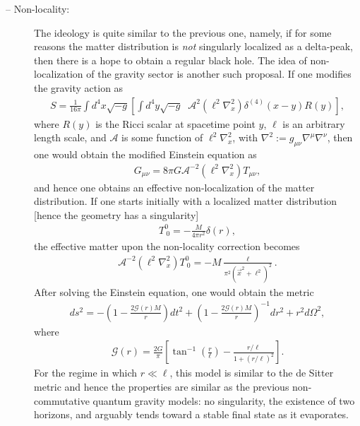 \documentclass[12pt]{article}
\newcommand{\2}{$^2$}
\newcommand{\3}{$^3$}
\newcommand{\4}{$_4$}
\newcommand{\5}{$_5$}
\begin{document}
\begin{description}
\item[-- Non-locality:] The ideology is quite similar to the previous one, namely, if for some reasons the matter distribution is \emph{not} singularly localized as a delta-peak, then there is a hope to obtain a regular black hole. The idea of non-localization of the gravity sector \cite{1202.2102} is another such proposal. If one modifies the gravity action as
\begin{eqnarray}
S = \frac{1}{16\pi} \int d^{4}x \sqrt{-g} \left[ \int d^{4}y \sqrt{-g}\;\; \mathcal{A}^{2}\left( \ell^{2} \nabla_{x}^{2} \right) \delta^{(4)}\left( x - y \right) R(y)\right],
\end{eqnarray}
where $R(y)$ is the Ricci scalar at spacetime point $y$, $\ell$ is an arbitrary length scale, and $\mathcal{A}$ is some function of $\ell^{2} \nabla_{x}^{2}$, with $\nabla^2 := g_{\mu\nu}\nabla^\mu \nabla^\nu$, then one would obtain the modified Einstein equation as
\begin{eqnarray}
G_{\mu\nu} = 8\pi G \mathcal{A}^{-2}\left({\ell^{2} \nabla_{x}^{2}}\right) T_{\mu\nu},
\end{eqnarray}
and hence one obtains an effective non-localization of the matter distribution. If one starts initially with a localized matter distribution [hence the geometry has a singularity]
\begin{eqnarray}
T^{0}_{~0} = - \frac{M}{4\pi r^{2}} \delta(r),
\end{eqnarray}
the effective matter upon the non-locality correction becomes
\begin{eqnarray}
\mathcal{A}^{-2}\left({\ell^{2} \nabla_{x}^{2}}\right) T^{0}_{~0} = - M \frac{\ell}{\pi^{2} (\vec{x}^{2} + \ell^{2})^{2}}.
\end{eqnarray}
After solving the Einstein equation, one would obtain the metric
\begin{eqnarray}
ds^{2} = - \left(1 - \frac{2 \mathcal{G}(r) M}{r} \right) dt^{2} + \left(1 - \frac{2 \mathcal{G}(r) M}{r} \right)^{-1} dr^{2} + r^{2} d\Omega^{2},
\end{eqnarray}
where
\begin{eqnarray}
\mathcal{G}(r) = \frac{2G}{\pi} \left[ \tan^{-1} \left(\frac{r}{\ell}\right) - \frac{r/\ell}{1+(r/\ell)^{2}} \right].
\end{eqnarray}
For the regime in which $r \ll \ell$, this model is similar to the de Sitter metric and hence the properties are similar as the previous non-commutative quantum gravity models: no singularity, the existence of two horizons, and arguably tends toward a stable final state as it evaporates.
\end{description}
\end{document}
